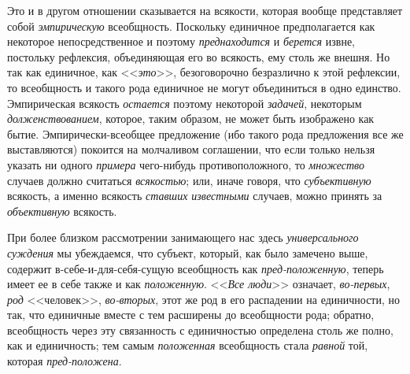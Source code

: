 \label{bkm:bm38a}Это и в другом отношении сказывается на
всякости, которая вообще представляет собой
{\em эмпирическую}
всеобщность. Поскольку единичное предполагается как некоторое
непосредственное и поэтому
{\em преднаходится} и
{\em берется} извне,
постольку рефлексия, объединяющая его во всякость, ему столь же внешня. Но
так как единичное, как <<{\em это}>>,
безоговорочно безразлично к этой рефлексии, то всеобщность и
такого рода единичное не могут объединиться в одно единство. Эмпирическая
всякость {\em остается}
поэтому некоторой
{\em задачей}, некоторым
{\em долженствованием},
которое, таким образом, не может быть изображено как бытие.
Эмпирически-всеобщее предложение (ибо такого рода предложения все же
выставляются) покоится на молчаливом соглашении, что если только нельзя
указать ни одного {\em примера}
чего-нибудь противоположного, то
{\em множество} случаев
должно считаться {\em всякостью};
или, иначе говоря, что
{\em субъективную}
всякость, а именно всякость
{\em ставших известными}
случаев, можно принять за
{\em объективную}
всякость.

При более близком рассмотрении занимающего нас здесь
{\em универсального суждения}
мы убеждаемся, что субъект, который, как было замечено выше,
содержит в-себе-и-для-себя-сущую всеобщность как
{\em пред-положенную},
теперь имеет ее в себе также и как
{\em положенную}.
<<{\em Все люди}>> означает,
{\em во-первых},
{\em род} <<человек>>,
{\em во-вторых}, этот же
род в его распадении на единичности, но так, что единичные вместе с тем
расширены до всеобщности рода; обратно, всеобщность через эту связанность с
единичностью определена столь же полно, как и единичность; тем самым
{\em положенная}
всеобщность стала
{\em равной} той, которая
{\em пред-положена}.


